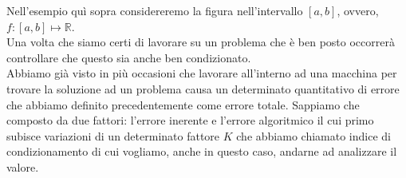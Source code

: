 \documentclass[12pt, a4paper]{book}
\theoremstyle{definition}
\begin{document}
\begin{flushleft}
\begin{figure}[!h]
\end{figure}


Nell'esempio quì sopra considereremo la figura nell'intervallo $[a,b]$, ovvero, $f: [a,b] \mapsto \mathbb{R}$.\\
Una volta che siamo certi di lavorare su un problema che è ben posto occorrerà controllare che questo sia anche ben condizionato. \\
Abbiamo già visto in più occasioni che lavorare all'interno ad una macchina per trovare la soluzione ad un problema causa un determinato quantitativo di errore che abbiamo definito precedentemente come errore totale. 
Sappiamo che composto da due fattori: l'errore inerente e l'errore algoritmico il cui primo subisce variazioni di un determinato fattore $K$ che abbiamo chiamato indice di condizionamento di cui vogliamo, anche in questo caso, andarne ad analizzare il valore.
\end{flushleft}
\end{document}
